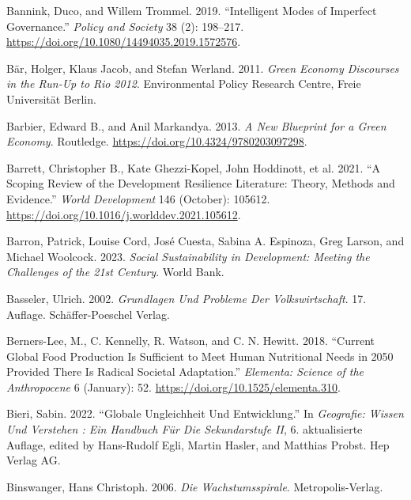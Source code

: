 \documentclass[
  a4paper,
  DIV=11,
  numbers=noendperiod,
  oneside,
  openany]{scrreprt}
\newlength{\cslhangindent}
\newenvironment{CSLReferences}[2] %
 {\begin{list}{}{%
  \setlength{\itemindent}{0pt}
  \setlength{\leftmargin}{0pt}
  \setlength{\parsep}{0pt}
  \ifodd #1
   \setlength{\leftmargin}{\cslhangindent}
   \setlength{\itemindent}{-1\cslhangindent}
  \fi
  \setlength{\itemsep}{#2\baselineskip}}}
 {\end{list}}
\begin{document}
\begin{CSLReferences}{1}{1}
Bannink, Duco, and Willem Trommel. 2019. {``Intelligent Modes of
Imperfect Governance.''} \emph{Policy and Society} 38 (2): 198--217.
\url{https://doi.org/10.1080/14494035.2019.1572576}.

Bär, Holger, Klaus Jacob, and Stefan Werland. 2011. \emph{Green {Economy
Discourses} in the {Run-Up} to {Rio} 2012}. Environmental Policy
Research Centre, Freie Universität Berlin.

Barbier, Edward B., and Anil Markandya. 2013. \emph{A {New Blueprint}
for a {Green Economy}}. Routledge.
\url{https://doi.org/10.4324/9780203097298}.

Barrett, Christopher B., Kate Ghezzi-Kopel, John Hoddinott, et al. 2021.
{``A Scoping Review of the Development Resilience Literature: {Theory},
Methods and Evidence.''} \emph{World Development} 146 (October): 105612.
\url{https://doi.org/10.1016/j.worlddev.2021.105612}.

Barron, Patrick, Louise Cord, José Cuesta, Sabina A. Espinoza, Greg
Larson, and Michael Woolcock. 2023. \emph{Social {Sustainability} in
{Development}: {Meeting} the {Challenges} of the 21st {Century}}. World
Bank.

Basseler, Ulrich. 2002. \emph{Grundlagen Und {Probleme} Der
{Volkswirtschaft}}. 17. Auflage. Sch{ä}ffer-Poeschel Verlag.

Berners-Lee, M., C. Kennelly, R. Watson, and C. N. Hewitt. 2018.
{``Current Global Food Production Is Sufficient to Meet Human
Nutritional Needs in 2050 Provided There Is Radical Societal
Adaptation.''} \emph{Elementa: Science of the Anthropocene} 6 (January):
52. \url{https://doi.org/10.1525/elementa.310}.

Bieri, Sabin. 2022. {``Globale {Ungleichheit} Und {Entwicklung}.''} In
\emph{Geografie: {Wissen} Und Verstehen : Ein {Handbuch} Für Die
{Sekundarstufe} {II}}, 6. aktualisierte Auflage, edited by Hans-Rudolf
Egli, Martin Hasler, and Matthias Probst. Hep Verlag AG.

Binswanger, Hans Christoph. 2006. \emph{Die {Wachstumsspirale}}.
Metropolis-Verlag.


\end{CSLReferences}
\end{document}
